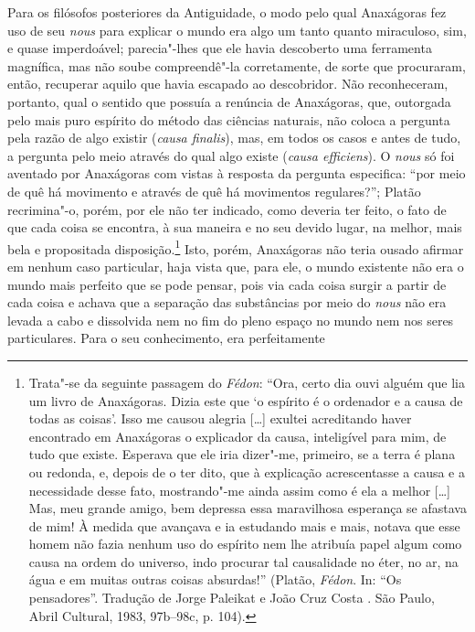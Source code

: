 Para os filósofos posteriores da Antiguidade, o modo pelo qual Anaxágoras fez
uso de seu \textit{nous} para explicar o mundo era algo um tanto quanto
miraculoso, sim, e quase imperdoável; parecia"-lhes que ele havia descoberto
uma ferramenta magnífica, mas não soube compreendê"-la corretamente, de sorte
que procuraram, então, recuperar aquilo que havia escapado ao descobridor.
Não reconheceram, portanto, qual o sentido que possuía a renúncia de
Anaxágoras, que, outorgada pelo mais puro espírito do método das ciências
naturais, não coloca a pergunta pela razão de algo existir (\textit{causa finalis}),
 mas, em \label{causafinalis} todos os casos e antes de
tudo, a pergunta pelo meio através do qual algo existe (\textit{causa efficiens}). 
O \textit{nous} só foi aventado por Anaxágoras com vistas
à resposta da pergunta especifica: ``por meio de quê há movimento e através
de quê há movimentos regulares?''; Platão recrimina"-o, porém, por ele não
ter indicado, como deveria ter feito, o fato de que cada coisa se encontra, à
sua maneira e no seu devido lugar, na melhor, mais bela e propositada
disposição.\footnote{ Trata"-se da seguinte passagem do \textit{Fédon}: 
``Ora, certo dia ouvi alguém que lia um livro de Anaxágoras. Dizia
este que `o espírito é o ordenador e a causa de todas as coisas'. Isso me
causou alegria [\ldots] exultei acreditando haver encontrado em Anaxágoras o
explicador da causa, inteligível para mim, de tudo que existe. Esperava que
ele iria dizer"-me, primeiro, se a terra é plana ou redonda, e, depois de o
ter dito, que à explicação acrescentasse a causa e a necessidade desse fato,
mostrando"-me ainda assim como é ela a melhor [\ldots] Mas, meu grande amigo,
bem depressa essa maravilhosa esperança se afastava de mim! À medida que
avançava e ia estudando mais e mais, notava que esse homem não fazia nenhum
uso do espírito nem lhe atribuía papel algum como causa na ordem do universo,
indo procurar tal causalidade no éter, no ar, na água e em muitas outras
coisas absurdas!'' (Platão, \textit{Fédon}. In: ``Os pensadores''. Tradução de Jorge Paleikat e João Cruz
 Costa . São Paulo, Abril Cultural, 1983, 97b--98c, p. 104).} Isto, porém,
 Anaxágoras não teria ousado afirmar em nenhum caso particular, haja vista
 que, para ele, o mundo existente não era o mundo mais perfeito que se pode
 pensar, pois via cada coisa surgir a partir de cada coisa e achava que a
 separação das substâncias por meio do \textit{nous} não era levada a cabo e 
 dissolvida nem no fim do pleno espaço no
 mundo nem nos seres particulares. Para o seu conhecimento, era perfeitamente
